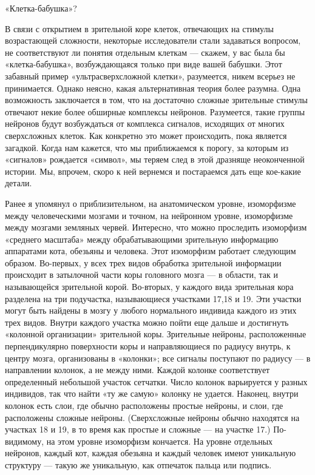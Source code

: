 \documentclass[../main.tex]{subfiles}
\begin{document}
«Клетка-бабушка»?

В связи с открытием в зрительной коре клеток, отвечающих на стимулы возрастающей сложности, некоторые исследователи стали задаваться вопросом, не соответствуют ли понятия отдельным клеткам --- скажем, у вас была бы «клетка-бабушка», возбуждающаяся только при виде вашей бабушки. Этот забавный пример «ультрасверхсложной клетки», разумеется, никем всерьез не принимается. Однако неясно, какая альтернативная теория более разумна. Одна возможность заключается в том, что на достаточно сложные зрительные стимулы отвечают некие более обширные комплексы нейронов. Разумеется, такие группы нейронов будут возбуждаться от комплекса сигналов, исходящих от многих сверхсложных клеток. Как конкретно это может происходить, пока является загадкой. Когда нам кажется, что мы приближаемся к порогу, за которым из «сигналов» рождается «символ», мы теряем след в этой дразняще неоконченной истории. Мы, впрочем, скоро к ней вернемся и постараемся дать еще кое-какие детали.

Ранее я упомянул о приблизительном, на анатомическом уровне, изоморфизме между человеческими мозгами и точном, на нейронном уровне, изоморфизме между мозгами земляных червей. Интересно, что можно проследить изоморфизм «среднего масштаба» между обрабатывающими зрительную информацию аппаратами кота, обезьяны и человека. Этот изоморфизм работает следующим образом. Во-первых, у всех трех видов обработка зрительной информации происходит в затылочной части коры головного мозга --- в области, так и называющейся зрительной корой. Во-вторых, у каждого вида зрительная кора разделена на три подучастка, называющиеся участками 17,18 и 19. Эти участки могут быть найдены в мозгу у любого нормального индивида каждого из этих трех видов. Внутри каждого участка можно пойти еще дальше и достигнуть «колонной организации» зрительной коры. Зрительные нейроны, расположенные перпендикулярно поверхности коры и направляющиеся по радиусу внутрь, к центру мозга, организованы в «колонки»; все сигналы поступают по радиусу --- в направлении колонок, а не между ними. Каждой колонке соответствует определенный небольшой участок сетчатки. Число колонок варьируется у разных индивидов, так что найти «ту же самую» колонку не удается. Наконец, внутри колонок есть слои, где обычно расположены простые нейроны, и слои, где расположены сложные нейроны. (Сверхсложные нейроны обычно находятся на участках 18 и 19, в то время как простые и сложные --- на участке 17.) По-видимому, на этом уровне изоморфизм кончается. На уровне отдельных нейронов, каждый кот, каждая обезьяна и каждый человек имеют уникальную структуру --- такую же уникальную, как отпечаток пальца или подпись.
\end{document}
